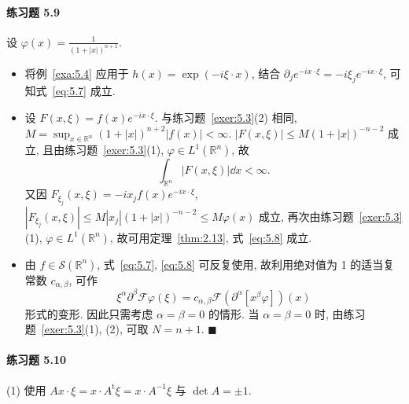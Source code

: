 \paragraph*{练习题 5.9}
设 $\varphi(x) = \frac{1}{(1+|x|)^{n+1}}$.

\begin{itemize}
\item 将例~\ref{exa:5.4} 应用于 $h(x) = \exp(-i\xi \cdot x)$, 结合 $\partial_{j}e^{-ix \cdot \xi} = -i\xi_{j}e^{-ix \cdot \xi}$, 可知式~\eqref{eq:5.7} 成立.

\item 设 $F(x, \xi) = f(x)e^{-ix \cdot \xi}$. 与练习题~\ref{exer:5.3}(2) 相同, $M = \sup_{x \in \mathbb{R}^{n}}(1+|x|)^{n+2}|f(x)| < \infty$. $|F(x, \xi)| \leq M(1+|x|)^{-n-2}$ 成立, 且由练习题~\ref{exer:5.3}(1), $\varphi \in L^{1}(\mathbb{R}^{n})$, 故
\[
\int_{\mathbb{R}^{n}}|F(x, \xi)|\dd x < \infty.
\]
又因 $F_{\xi_{j}}(x, \xi) = -ix_{j}f(x)e^{-ix \cdot \xi}$, $|F_{\xi_{j}}(x, \xi)| \leq M|x_{j}|(1+|x|)^{-n-2} \leq M\varphi(x)$ 成立, 再次由练习题~\ref{exer:5.3}(1), $\varphi \in L^{1}(\mathbb{R}^{n})$, 故可用定理~\ref{thm:2.13}, 式~\eqref{eq:5.8} 成立.

\item 由 $f \in \mathcal{S}(\mathbb{R}^{n})$, 式~\eqref{eq:5.7}, \eqref{eq:5.8} 可反复使用, 故利用绝对值为 1 的适当复常数 $c_{\alpha,\beta}$, 可作
\[
\xi^{\alpha}\partial^{\beta}\mathcal{F}\varphi(\xi) = c_{\alpha,\beta}\mathcal{F}(\partial^{\alpha}[x^{\beta}\varphi])(x)
\]
形式的变形. 因此只需考虑 $\alpha = \beta = 0$ 的情形. 当 $\alpha = \beta = 0$ 时, 由练习题~\ref{exer:5.3}(1), (2), 可取 $N = n+1$. $\blacksquare$
\end{itemize}

\paragraph*{练习题 5.10}
(1) 使用 $Ax \cdot \xi = x \cdot A^{\mathrm{t}}\xi = x \cdot A^{-1}\xi$ 与 $\det A = \pm 1$.

